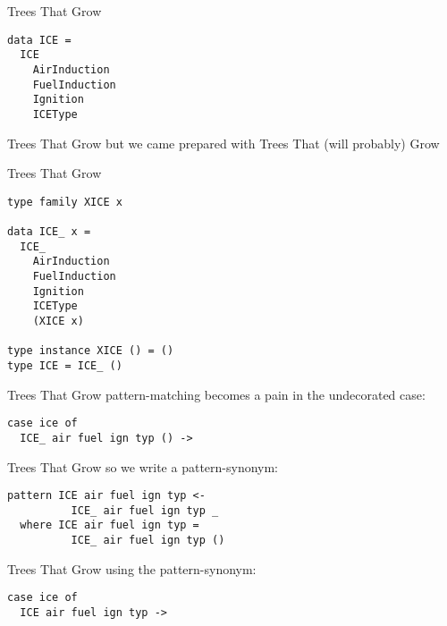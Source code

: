 \begin{frame}[fragile]
\begin{block}{Trees That Grow}
\begin{lstlisting}[style=haskell]
data ICE =
  ICE
    AirInduction
    FuelInduction
    Ignition
    ICEType
\end{lstlisting}
\end{block}
\end{frame}

\begin{frame}[fragile]
\begin{block}{Trees That Grow}
but we came prepared with Trees That (will probably) Grow
\end{block}
\end{frame}

\begin{frame}[fragile]
\begin{block}{Trees That Grow}
\begin{lstlisting}[style=haskell]
type family XICE x

data ICE_ x =
  ICE_
    AirInduction
    FuelInduction
    Ignition
    ICEType
    (XICE x)

type instance XICE () = ()
type ICE = ICE_ ()
\end{lstlisting}
\end{block}
\end{frame}

\begin{frame}[fragile]
\begin{block}{Trees That Grow}
pattern-matching becomes a pain in the undecorated case:
\begin{lstlisting}[style=haskell]
case ice of
  ICE_ air fuel ign typ () -> 
\end{lstlisting}
\end{block}
\end{frame}

\begin{frame}[fragile]
\begin{block}{Trees That Grow}
so we write a pattern-synonym:
\begin{lstlisting}[style=haskell]
pattern ICE air fuel ign typ <-
          ICE_ air fuel ign typ _
  where ICE air fuel ign typ =
          ICE_ air fuel ign typ ()
\end{lstlisting}
\end{block}
\end{frame}
 
\begin{frame}[fragile]
\begin{block}{Trees That Grow}
using the pattern-synonym:
\begin{lstlisting}[style=haskell]
case ice of
  ICE air fuel ign typ -> 
\end{lstlisting}
\end{block}
\end{frame}
 
